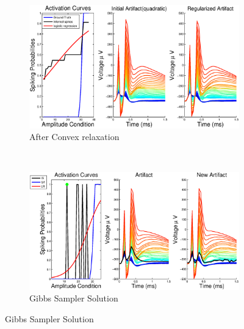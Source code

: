 \documentclass[12pt,letterpaper,fleqn]{article}
\begin{document}
\pagebreak 
   \begin{figure}[ht!]
        \centering
        \begin{subfigure}[b]{0.5\textwidth}
                \includegraphics[width=\textwidth]{i0.eps}
                \caption{After Convex relaxation}
                \label{fig:gull}
        \end{subfigure}%
~\begin{subfigure}[b]{0.5\textwidth}
                \includegraphics[width=\textwidth]{i1.eps}
                \caption{Gibbs Sampler Solution}
                \label{fig:tiger}
        \end{subfigure}
 

\end{figure}
\end{document}
